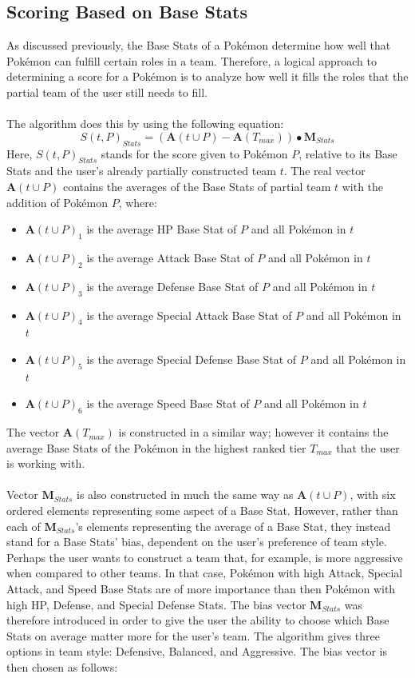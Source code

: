 \documentclass{article}
\begin{document}
\subsection{Scoring Based on Base Stats}\label{scoringBaseStats}
As discussed previously, the Base Stats of a Pok\'emon determine how well that Pok\'emon can fulfill certain roles in a team. Therefore, a logical approach to determining a score for a Pok\'emon is to analyze how well it fills the roles that the partial team of the user still needs to fill.\\\\
The algorithm does this by using the following equation:
\begin{equation}\label{statsScoreEqn}
	S(t,P)_{Stats}=(\textbf{A}(t\cup P)-\textbf{A}(T_{max}))\bullet\textbf{M}_{Stats}
\end{equation}
Here, $S(t,P)_{Stats}$ stands for the score given to Pok\'emon $P$, relative to its Base Stats and the user's already partially constructed team $t$. The real vector $\textbf{A}(t\cup P)$ contains the averages of the Base Stats of partial team $t$ with the addition of Pok\'emon $P$, where:
\begin{itemize}
	\item $\textbf{A}(t\cup P)_1$ is the average HP Base Stat of $P$ and all Pok\'emon in $t$
	\item $\textbf{A}(t\cup P)_2$ is the average Attack Base Stat of $P$ and all Pok\'emon in $t$
	\item $\textbf{A}(t\cup P)_3$ is the average Defense Base Stat of $P$ and all Pok\'emon in $t$
	\item $\textbf{A}(t\cup P)_4$ is the average Special Attack Base Stat of $P$ and all Pok\'emon in $t$
	\item $\textbf{A}(t\cup P)_5$ is the average Special Defense Base Stat of $P$ and all Pok\'emon in $t$
	\item $\textbf{A}(t\cup P)_6$ is the average Speed Base Stat of $P$ and all Pok\'emon in $t$
\end{itemize}
The vector $\textbf{A}(T_{max})$ is constructed in a similar way; however it contains the average Base Stats of the Pok\'emon in the highest ranked tier $T_{max}$ that the user is working with.\\\\
Vector $\textbf{M}_{Stats}$ is also constructed in much the same way as $\textbf{A}(t\cup P)$, with six ordered elements representing some aspect of a Base Stat. However, rather than each of $\textbf{M}_{Stats}$'s elements representing the average of a Base Stat, they instead stand for a Base Stats' bias, dependent on the user's preference of team style. Perhaps the user wants to construct a team that, for example, is more aggressive when compared to other teams. In that case, Pok\'emon with high Attack, Special Attack, and Speed Base Stats are of more importance than then Pok\'emon with high HP, Defense, and Special Defense Stats. The bias vector $\textbf{M}_{Stats}$ was therefore introduced in order to give the user the ability to choose which Base Stats on average matter more for the user's team. The algorithm gives three options in team style: Defensive, Balanced, and Aggressive. The bias vector is then chosen as follows:
\end{document}
